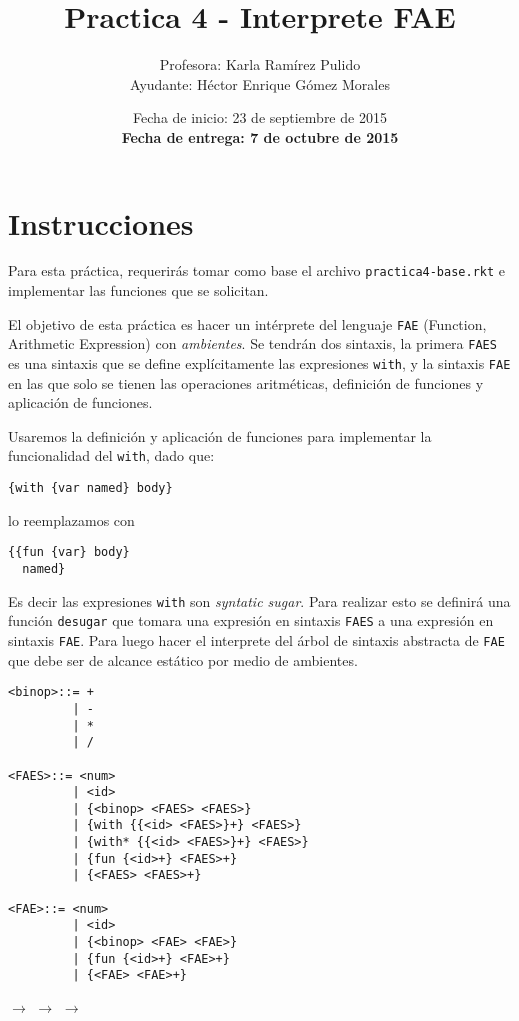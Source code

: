 \documentclass{article}
\author{Profesora: Karla Ramírez Pulido\\
  Ayudante: Héctor Enrique Gómez Morales}
\title{Practica 4 - Interprete FAE}
\date{Fecha de inicio: 23 de septiembre de 2015\\
  \textbf{Fecha de entrega: 7 de octubre de 2015}}
\begin{document}
\maketitle
\section{Instrucciones}

Para esta práctica, requerirás tomar como base el archivo \texttt{practica4-base.rkt} e implementar las funciones que se solicitan.

El objetivo de esta práctica es hacer un intérprete del lenguaje \texttt{FAE} (Function, Arithmetic Expression) con \emph{ambientes}. Se tendrán dos sintaxis, la primera \texttt{FAES} es una sintaxis que se define explícitamente las expresiones \texttt{with}, y la sintaxis \texttt{FAE} en las que solo se tienen las operaciones aritméticas, definición de funciones y aplicación de funciones.

Usaremos la definición y aplicación de funciones para implementar la funcionalidad del \texttt{with}, dado que:
\begin{verbatim}
{with {var named} body}

\end{verbatim}

lo reemplazamos con

\begin{verbatim}
{{fun {var} body}
  named}
\end{verbatim}

Es decir las expresiones \texttt{with} son \emph{syntatic sugar}. Para realizar esto se definirá una función \texttt{desugar} que tomara una expresión en sintaxis \texttt{FAES} a una expresión en sintaxis \texttt{FAE}. Para luego hacer el interprete del árbol de sintaxis abstracta de \texttt{FAE} que debe ser de alcance estático por medio de ambientes.

\begin{verbatim}
<binop>::= +
         | -
         | *
         | /

<FAES>::= <num>
         | <id>
         | {<binop> <FAES> <FAES>}
         | {with {{<id> <FAES>}+} <FAES>}
         | {with* {{<id> <FAES>}+} <FAES>}
         | {fun {<id>+} <FAES>+}
         | {<FAES> <FAES>+}

<FAE>::= <num>
         | <id>
         | {<binop> <FAE> <FAE>}
         | {fun {<id>+} <FAE>+}
         | {<FAE> <FAE>+}
\end{verbatim}

\begin{center}
 $\rightarrow$
 $\rightarrow$
 $\rightarrow$
\end{center}
\end{document}
